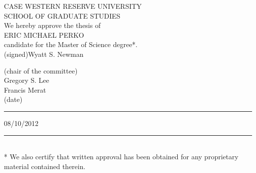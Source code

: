 \thispagestyle{empty}
\begin{doublespace}
	\begin{center}
		{ \large CASE WESTERN RESERVE UNIVERSITY }\\[0.5in]
		{ \large SCHOOL OF GRADUATE STUDIES }\\[0.5in]
		
		We hereby approve the thesis of
		\\[0.3in]
		ERIC MICHAEL PERKO
		\\[0.3in]
		candidate for the Master of Science degree*.
		\\[0.5in]

		(signed)\hrulefill Wyatt S. Newman \hrulefill
		
		(chair of the committee)\\[0.5in]

		\hrulefill Gregory S. Lee \hrulefill \\[0.5in]
		
		\hrulefill Francis Merat \hrulefill\\[0.5in]
		
		(date)\rule{0.25\textwidth}{0.4pt} 08/10/2012 \rule{0.25\textwidth}{0.4pt} \\[0.3in]

		* We also certify that written approval has been obtained for any proprietary material contained therein.

	\end{center}
\end{doublespace}